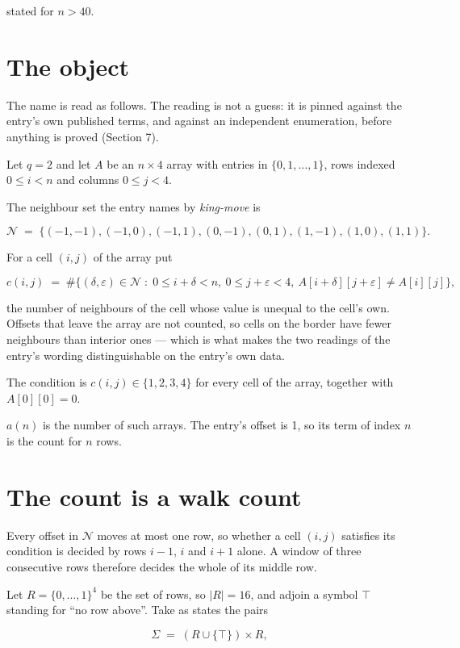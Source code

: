 \documentclass[11pt]{article}
\theoremstyle{definition}
\begin{document}
stated for $n > 40$.

\section{The object}

The name is read as follows. The reading is not a guess: it is pinned against the entry's own published terms, and against an independent enumeration, before anything is proved (Section 7).

Let $q = 2$ and let $A$ be an $n \times 4$ array with entries in $\{0,1,\dots,1\}$, rows indexed $0 \le i < n$ and columns $0 \le j < 4$.

The neighbour set the entry names by {\itshape king-move} is

\[\mathcal{N} \;=\; \{(-1,-1), (-1,0), (-1,1), (0,-1), (0,1), (1,-1), (1,0), (1,1)\}.\]

For a cell $(i,j)$ of the array put

\[c(i,j) \;=\; \#\bigl\{(\delta,\varepsilon)\in\mathcal{N} \;:\; 0\le i+\delta<n,\ 0\le j+\varepsilon<4,\ A[i+\delta][j+\varepsilon] \neq A[i][j]\bigr\},\]

the number of neighbours of the cell whose value is unequal to the cell's own. Offsets that leave the array are not counted, so cells on the border have fewer neighbours than interior ones --- which is what makes the two readings of the entry's wording distinguishable on the entry's own data.

The condition is $c(i,j) \in \{1, 2, 3, 4\}$ for every cell of the array, together with $A[0][0]=0$.

$a(n)$ is the number of such arrays. The entry's offset is 1, so its term of index $n$ is the count for $n$ rows.

\section{The count is a walk count}

Every offset in $\mathcal{N}$ moves at most one row, so whether a cell $(i,j)$ satisfies its condition is decided by rows $i-1$, $i$ and $i+1$ alone. A window of three consecutive rows therefore decides the whole of its middle row.

Let $R = \{0,\dots,1\}^{4}$ be the set of rows, so $|R| = 16$, and adjoin a symbol $\top$ standing for ``no row above''. Take as states the pairs

\[\Sigma \;=\; (R \cup \{\top\}) \times R,\]
\end{document}
